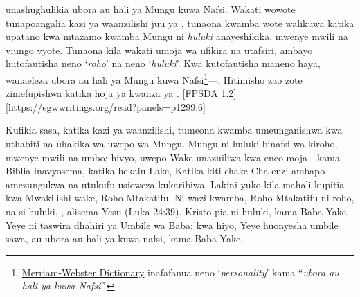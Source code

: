 

 unashughulikia ubora au hali ya Mungu kuwa Nafsi. Wakati wowote tunapoangalia kazi ya waanzilishi juu ya , tunaona kwamba wote walikuwa katika upatano kwa mtazamo kwamba Mungu ni \textit{huluki} anayeshikika, mwenye mwili na viungo vyote. Tunaona kila wakati umoja wa ufikira na utafsiri, ambayo hutofautisha neno ‘\textit{roho}’ na neno ‘\textit{huluki}’. Kwa kutofautisha maneno haya, wanaeleza ubora au hali ya Mungu kuwa Nafsi\footnote{\href{https://www.merriam-webster.com/dictionary/personality}{Merriam-Webster Dictionary} inafafanua neno ‘\textit{personality}’ kama “\textit{ubora au hali ya kuwa Nafsi}”.}—. Hitimisho zao zote zimefupishwa katika hoja ya kwanza ya . [FPSDA 1.2][https://egwwritings.org/read?panels=p1299.6]

Kufikia sasa, katika kazi ya waanzilishi, tumeona kwamba  umeunganishwa kwa uthabiti na uhakika wa uwepo wa Mungu. Mungu ni huluki binafsi wa kiroho, mwenye mwili na umbo; hivyo, uwepo Wake unazuiliwa kwa eneo moja—kama Biblia inavyosema, katika hekalu Lake, Katika kiti chake Cha enzi ambapo amezungukwa na utukufu usioweza kukaribiwa. Lakini yuko kila mahali kupitia kwa Mwakilishi wake, Roho Mtakatifu. Ni wazi kwamba, Roho Mtakatifu ni roho, na si huluki, , alisema Yesu (Luka 24:39). Kristo pia ni huluki, kama Baba Yake. Yeye ni taswira dhahiri ya Umbile wa Baba; kwa hiyo, Yeye huonyesha umbile sawa, au ubora au hali ya kuwa nafsi, kama Baba Yake.

